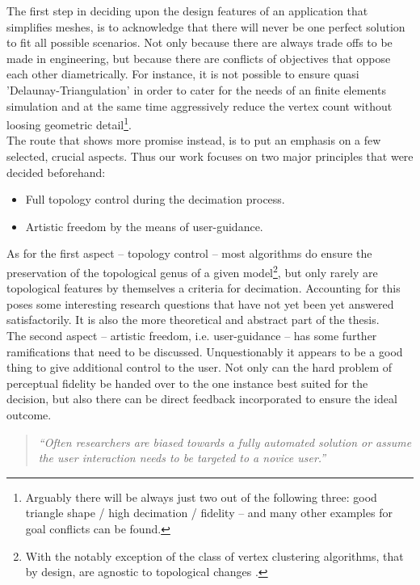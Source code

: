 The first step in deciding upon the design features of an application that simplifies meshes, is to acknowledge that there will never be one perfect solution to fit all possible scenarios.
Not only because there are always trade offs to be made in engineering, but because there are conflicts of objectives that oppose each other diametrically.
For instance, it is not possible to ensure quasi 'Delaunay-Triangulation' in order to cater for the needs of an finite elements simulation and at the same time aggressively reduce the vertex count without loosing geometric detail\footnote{ Arguably there will be always just two out of the following three: good triangle shape / high decimation / fidelity -- and many other examples for goal conflicts can be found.}.\\
The route that shows more promise instead, is to put an emphasis on a few selected, crucial aspects.
Thus our work focuses on two major principles that were decided beforehand:
\begin{itemize}
    \item Full topology control during the decimation process.
    \item Artistic freedom by the means of user-guidance.
\end{itemize}
As for the first aspect -- topology control -- most algorithms do ensure the preservation of the topological genus of a given model\footnote{ With the notably exception of the class of vertex clustering algorithms, that by design, are agnostic to topological changes \citep[cf. the original paper by][]{Rossignac1993}.}, but only rarely are topological features by themselves a criteria for decimation.
Accounting for this poses some interesting research questions that have not yet been yet answered satisfactorily.
It is also the more theoretical and abstract part of the thesis.\\
The second aspect -- artistic freedom, i.e. user-guidance -- has some further ramifications that need to be discussed.
Unquestionably it appears to be a good thing to give additional control to the user.
Not only can the hard problem of perceptual fidelity be handed over to the one instance best suited for the decision, but also there can be direct feedback incorporated to ensure the ideal outcome.
\begin{quote} \textit{``Often researchers are biased towards a fully automated solution or assume the user interaction needs to be targeted to a novice user.''} \citep[p.195]{Sylwan2011} \end{quote}
